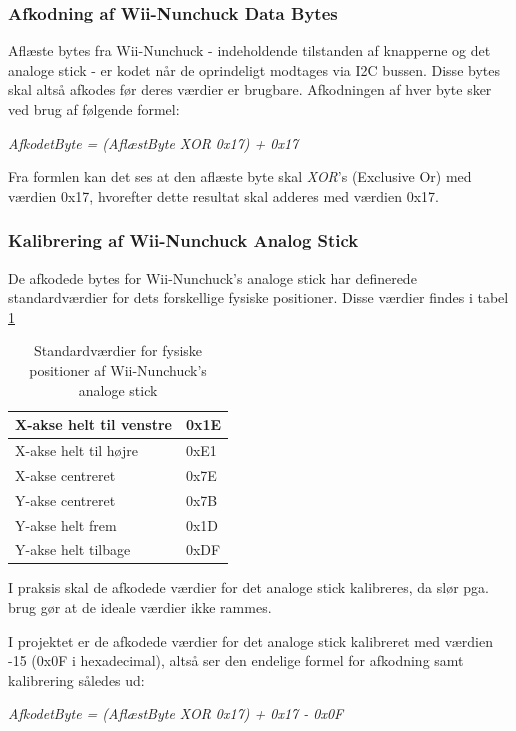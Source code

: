 \subsubsection{Afkodning af Wii-Nunchuck Data Bytes}
Aflæste bytes fra Wii-Nunchuck - indeholdende tilstanden af knapperne og det analoge stick - er kodet når de oprindeligt modtages via I2C bussen. Disse bytes skal altså afkodes før deres værdier er brugbare. Afkodningen af hver byte sker ved brug af følgende formel:

\textit{AfkodetByte = (AflæstByte XOR 0x17) + 0x17}

Fra formlen kan det ses at den aflæste byte skal \textit{XOR}'s (Exclusive Or) med værdien 0x17, hvorefter dette resultat skal adderes med værdien 0x17.

\subsubsection{Kalibrering af Wii-Nunchuck Analog Stick}
De afkodede bytes for Wii-Nunchuck's analoge stick har definerede standardværdier for dets forskellige fysiske positioner. Disse værdier findes i tabel \ref{tabel:WiiNunchuckStickPositioner}

\begin{table}[H]
	\centering
	\begin{tabular}{|l|l|}
		\hline
		X-akse helt til venstre & 0x1E \\ \hline
		X-akse helt til højre   & 0xE1 \\ \hline
		X-akse centreret        & 0x7E \\ \hline
		Y-akse centreret        & 0x7B \\ \hline
		Y-akse helt frem        & 0x1D \\ \hline
		Y-akse helt tilbage     & 0xDF \\ \hline
	\end{tabular}
	\caption{Standardværdier for fysiske positioner af Wii-Nunchuck's analoge stick}
	\label{tabel:WiiNunchuckStickPositioner}
\end{table}

I praksis skal de afkodede værdier for det analoge stick kalibreres, da slør pga. brug gør at de ideale værdier ikke rammes. 

I projektet er de afkodede værdier for det analoge stick kalibreret med værdien -15 (0x0F i hexadecimal), altså ser den endelige formel for afkodning samt kalibrering således ud:

\textit{AfkodetByte = (AflæstByte XOR 0x17) + 0x17 - 0x0F}

